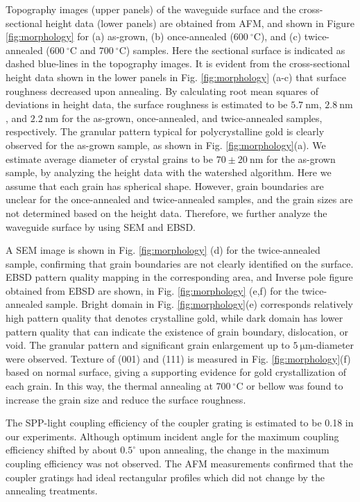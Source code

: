 \documentclass[aip,apl,reprint]{revtex4-1}
\begin{document}
Topography images (upper panels) of the waveguide surface and the cross-sectional height data (lower panels) are obtained from AFM, and shown in Figure \ref{fig:morphology} for (a) as-grown, (b) once-annealed ($600\:^\circ\mathrm{C}$), and (c) twice-annealed ($600\:^\circ\mathrm{C}$ and $700\:^\circ\mathrm{C}$) samples. Here the sectional surface is indicated as dashed blue-lines in the topography images.
It is evident from the cross-sectional height data shown in the lower panels in Fig. \ref{fig:morphology} (a-c) that surface roughness decreased upon annealing. By calculating root mean squares of deviations in height data, the surface roughness is estimated to be $5.7\:\mathrm{nm}$, $2.8\:\mathrm{nm}$, and $2.2\:\mathrm{nm}$ for the as-grown, once-annealed, and twice-annealed samples, respectively. 
The granular pattern typical for polycrystalline gold is clearly observed for the as-grown sample, as shown in Fig. \ref{fig:morphology}(a). We estimate average diameter of crystal grains to be $70\pm20\:\mathrm{nm}$ for the as-grown sample, by analyzing the height data with the watershed algorithm\cite{Petr}. Here we assume that each grain has spherical shape. However, grain boundaries are unclear for the once-annealed and twice-annealed samples, and the grain sizes are not determined based on the height data. Therefore, we further analyze the waveguide surface by using SEM and EBSD.

A SEM image is shown in Fig. \ref{fig:morphology} (d) for the twice-annealed sample, confirming that grain boundaries are not clearly identified on the surface.
EBSD pattern quality mapping in the corresponding area, and Inverse pole figure obtained from EBSD are shown, in Fig. \ref{fig:morphology} (e,f) for the twice-annealed sample. Bright domain in Fig. \ref{fig:morphology}(e) corresponds relatively high pattern quality that denotes crystalline gold, while dark domain has lower pattern quality that can indicate the existence of grain boundary, dislocation, or void. The granular pattern and significant grain enlargement up to $5\:\mathrm{\mu m}$-diameter were observed.
Texture of (001) and (111) is measured in Fig. \ref{fig:morphology}(f) based on normal surface, giving a supporting evidence for gold crystallization of each grain.
In this way, the thermal annealing at $700\:^\circ\mathrm{C}$ or bellow was found to increase the grain size and reduce the surface roughness.

The SPP-light coupling efficiency of the coupler grating is estimated to be 0.18 in our experiments. Although optimum incident angle for the maximum coupling efficiency shifted by about $0.5^\circ$ upon annealing, the change in the maximum coupling efficiency was not observed. The AFM measurements confirmed that the coupler gratings had ideal rectangular profiles which did not change by the annealing treatments. 
\end{document}
